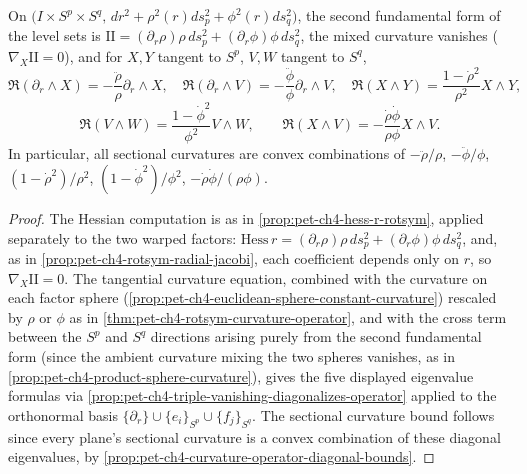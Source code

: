 \begin{theorem}
  \label{thm:pet-ch4-doubly-warped-curvature}
  On $\big(I\times S^p\times S^q,\,dr^2+\rho^2(r)ds_p^2+\phi^2(r)ds_q^2\big)$, the
  second fundamental form of the level sets is
  $\mathrm{II}=(\partial_r\rho)\rho\,ds_p^2+(\partial_r\phi)\phi\,ds_q^2$, the mixed
  curvature vanishes ($\nabla_X\mathrm{II}=0$), and for $X,Y$ tangent to $S^p$,
  $V,W$ tangent to $S^q$,
  \[
    \mathfrak{R}(\partial_r\wedge X)=-\frac{\ddot\rho}\rho\partial_r\wedge X,\quad
    \mathfrak{R}(\partial_r\wedge V)=-\frac{\ddot\phi}\phi\partial_r\wedge V,\quad
    \mathfrak{R}(X\wedge Y)=\frac{1-\dot\rho^2}{\rho^2}X\wedge Y,
  \]
  \[
    \mathfrak{R}(V\wedge W)=\frac{1-\dot\phi^2}{\phi^2}V\wedge W,\qquad
    \mathfrak{R}(X\wedge V)=-\frac{\dot\rho\dot\phi}{\rho\phi}X\wedge V.
  \]
  In particular, all sectional curvatures are convex combinations of
  $-\ddot\rho/\rho$, $-\ddot\phi/\phi$, $(1-\dot\rho^2)/\rho^2$,
  $(1-\dot\phi^2)/\phi^2$, $-\dot\rho\dot\phi/(\rho\phi)$.
\end{theorem}
\begin{proof}
  The Hessian computation is as in \cref{prop:pet-ch4-hess-r-rotsym}, applied
  separately to the two warped factors: $\mathrm{Hess}\,r=(\partial_r\rho)\rho\,ds_p^2+(\partial_r\phi)\phi\,ds_q^2$,
  and, as in \cref{prop:pet-ch4-rotsym-radial-jacobi}, each coefficient depends
  only on $r$, so $\nabla_X\mathrm{II}=0$. The tangential curvature equation,
  combined with the curvature on each factor sphere
  (\cref{prop:pet-ch4-euclidean-sphere-constant-curvature}) rescaled by $\rho$
  or $\phi$ as in \cref{thm:pet-ch4-rotsym-curvature-operator}, and with the
  cross term between the $S^p$ and $S^q$ directions arising purely from the
  second fundamental form (since the ambient curvature mixing the two spheres
  vanishes, as in \cref{prop:pet-ch4-product-sphere-curvature}), gives the five
  displayed eigenvalue formulas via
  \cref{prop:pet-ch4-triple-vanishing-diagonalizes-operator} applied to the
  orthonormal basis $\{\partial_r\}\cup\{e_i\}_{S^p}\cup\{f_j\}_{S^q}$. The
  sectional curvature bound follows since every plane's sectional curvature is
  a convex combination of these diagonal eigenvalues, by
  \cref{prop:pet-ch4-curvature-operator-diagonal-bounds}.
\end{proof}

